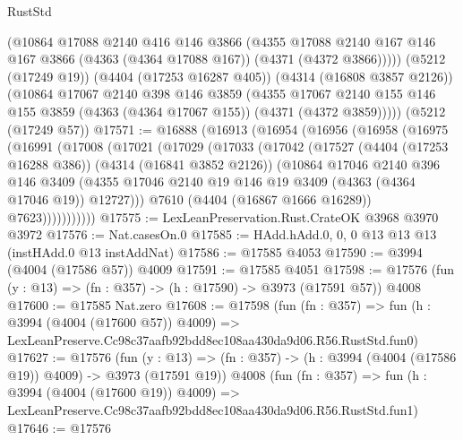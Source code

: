 \begin{lexlean}{RustStd}
\begin{coremodule}
        (@10864
          @17088
          @2140
          @416
          @146
          @3866
          (@4355
            @17088
            @2140
            @167
            @146
            @167
            @3866
            (@4363 (@4364 @17088 @167))
            (@4371 (@4372 @3866)))))
      (@5212 (@17249 @19))
      (@4404 (@17253 @16287 @405))
      (@4314 (@16808 @3857 @2126))
      (@10864
        @17067
        @2140
        @398
        @146
        @3859
        (@4355
          @17067
          @2140
          @155
          @146
          @155
          @3859
          (@4363 (@4364 @17067 @155))
          (@4371 (@4372 @3859)))))
    (@5212 (@17249 @57))
@17571 := @16888
    (@16913
      (@16954
        (@16956
          (@16958
            (@16975
              (@16991
                (@17008
                  (@17021
                    (@17029
                      (@17033
                        (@17042
                          (@17527
                            (@4404 (@17253 @16288 @386))
                            (@4314 (@16841 @3852 @2126))
                            (@10864
                              @17046
                              @2140
                              @396
                              @146
                              @3409
                              (@4355
                                @17046
                                @2140
                                @19
                                @146
                                @19
                                @3409
                                (@4363 (@4364 @17046 @19))
                                @12727)))
                          @7610
                          (@4404 (@16867 @1666 @16289))
                          @7623)))))))))))
@17575 := LexLeanPreservation.Rust.CrateOK @3968 @3970 @3972
@17576 := Nat.casesOn.{0}
@17585 := HAdd.hAdd.{0, 0, 0} @13 @13 @13 (instHAdd.{0} @13 instAddNat)
@17586 := @17585 @4053
@17590 := @3994 (@4004 (@17586 @57)) @4009
@17591 := @17585 @4051
@17598 := @17576 (fun (y : @13) => (fn : @357) -> (h : @17590) -> @3973 (@17591 @57)) @4008
@17600 := @17585 Nat.zero
@17608 := @17598
    (fun (fn : @357) =>
    fun (h : @3994 (@4004 (@17600 @57)) @4009) =>
    LexLeanPreserve.Cc98c37aafb92bdd8ec108aa430da9d06.R56.RustStd.fun0)
@17627 := @17576
    (fun (y : @13) => (fn : @357) -> (h : @3994 (@4004 (@17586 @19)) @4009) -> @3973 (@17591 @19))
    @4008
    (fun (fn : @357) =>
    fun (h : @3994 (@4004 (@17600 @19)) @4009) =>
    LexLeanPreserve.Cc98c37aafb92bdd8ec108aa430da9d06.R56.RustStd.fun1)
@17646 := @17576

\end{coremodule}
\end{lexlean}
